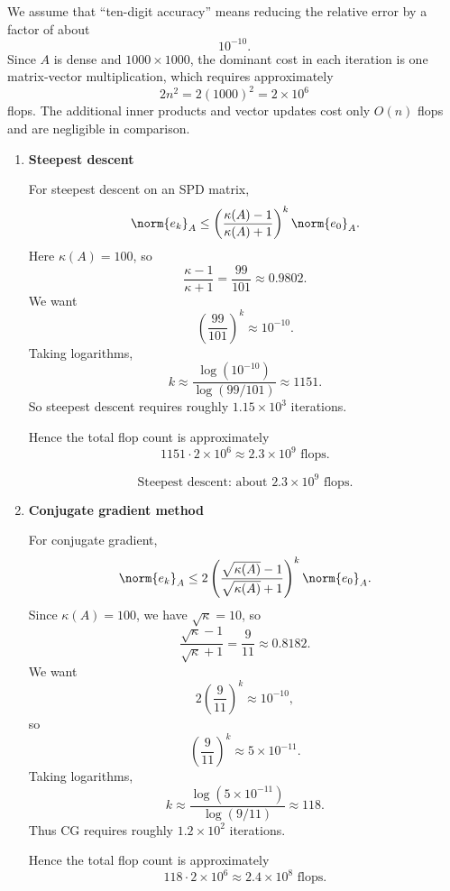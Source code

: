 \documentclass{ctexart}
\begin{document}
  \begin{solution}
    We assume that ``ten-digit accuracy'' means reducing the relative error by a factor of about
    \[
      10^{-10}.
    \]
    Since $A$ is dense and $1000\times 1000$, the dominant cost in each iteration is one
    matrix-vector multiplication, which requires approximately
    \[
      2n^2 = 2(1000)^2 = 2\times 10^6
    \]
    flops. The additional inner products and vector updates cost only $O(n)$ flops and are
    negligible in comparison.

    \begin{enumerate}[label=(\alph*)]
      \item \textbf{Steepest descent}

        For steepest descent on an SPD matrix,
        \[
          \norm{e_k}_A \le \left(\frac{\kappa(A)-1}{\kappa(A)+1}\right)^k \norm{e_0}_A.
        \]
        Here $\kappa(A)=100$, so
        \[
          \frac{\kappa-1}{\kappa+1}=\frac{99}{101}\approx 0.9802.
        \]
        We want
        \[
          \left(\frac{99}{101}\right)^k \approx 10^{-10}.
        \]
        Taking logarithms,
        \[
          k \approx \frac{\log(10^{-10})}{\log(99/101)} \approx 1151.
        \]
        So steepest descent requires roughly $1.15\times 10^3$ iterations.

        Hence the total flop count is approximately
        \[
          1151 \cdot 2\times 10^6 \approx 2.3\times 10^9 \text{ flops}.
        \]

        \[
          \boxed{\text{Steepest descent: about } 2.3\times 10^9 \text{ flops}.}
        \]

      \item \textbf{Conjugate gradient method}

        For conjugate gradient,
        \[
          \norm{e_k}_A \le
          2\left(\frac{\sqrt{\kappa(A)}-1}{\sqrt{\kappa(A)}+1}\right)^k \norm{e_0}_A.
        \]
        Since $\kappa(A)=100$, we have $\sqrt{\kappa}=10$, so
        \[
          \frac{\sqrt{\kappa}-1}{\sqrt{\kappa}+1}=\frac{9}{11}\approx 0.8182.
        \]
        We want
        \[
          2\left(\frac{9}{11}\right)^k \approx 10^{-10},
        \]
        so
        \[
          \left(\frac{9}{11}\right)^k \approx 5\times 10^{-11}.
        \]
        Taking logarithms,
        \[
          k \approx \frac{\log(5\times 10^{-11})}{\log(9/11)} \approx 118.
        \]
        Thus CG requires roughly $1.2\times 10^2$ iterations.

        Hence the total flop count is approximately
        \[
          118 \cdot 2\times 10^6 \approx 2.4\times 10^8 \text{ flops}.
        \]


\end{enumerate}
\end{solution}
\end{document}
